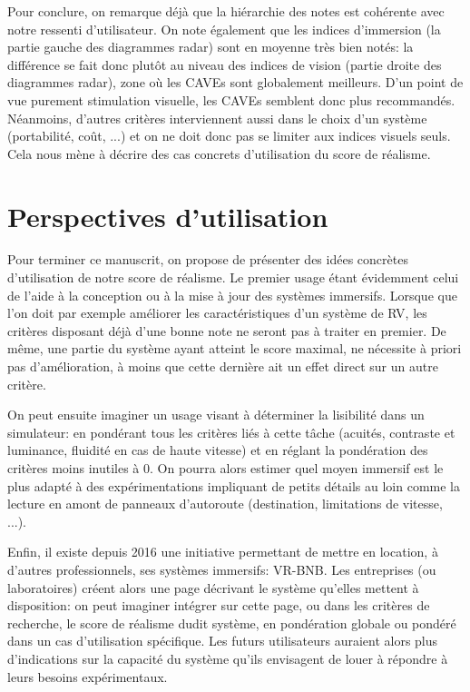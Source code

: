 \par Pour conclure, on remarque déjà que la hiérarchie des notes est cohérente avec notre ressenti d'utilisateur. On note également que les indices d'immersion (la partie gauche des diagrammes radar) sont en moyenne très bien notés: la différence se fait donc plutôt au niveau des indices de vision (partie droite des diagrammes radar), zone où les CAVEs sont globalement meilleurs. D'un point de vue purement stimulation visuelle, les CAVEs semblent donc plus recommandés. Néanmoins, d'autres critères interviennent aussi dans le choix d'un système (portabilité, coût, ...) et on ne doit donc pas se limiter aux indices visuels seuls. Cela nous mène à décrire des cas concrets d'utilisation du score de réalisme.

\section*{Perspectives d'utilisation}
\par Pour terminer ce manuscrit, on propose de présenter des idées concrètes d'utilisation de notre score de réalisme. Le premier usage étant évidemment celui de l'aide à la conception ou à la mise à jour des systèmes immersifs. Lorsque que l'on doit par exemple améliorer les caractéristiques d'un système de RV, les critères disposant déjà d'une bonne note ne seront pas à traiter en premier. De même, une partie du système ayant atteint le score maximal, ne nécessite à priori pas d'amélioration, à moins que cette dernière ait un effet direct sur un autre critère.

\par On peut ensuite imaginer un usage visant à déterminer la lisibilité dans un simulateur: en pondérant tous les critères liés à cette tâche (acuités, contraste et luminance, fluidité en cas de haute vitesse) et en réglant la pondération des critères moins inutiles à 0. On pourra alors estimer quel moyen immersif est le plus adapté à des expérimentations impliquant de petits détails au loin comme la lecture en amont de panneaux d'autoroute (destination, limitations de vitesse, ...).

\par Enfin, il existe depuis 2016 une initiative permettant de mettre en location, à d'autres professionnels, ses systèmes immersifs: VR-BNB. Les entreprises (ou laboratoires) créent alors une page décrivant le système qu'elles mettent à disposition: on peut imaginer intégrer sur cette page, ou dans les critères de recherche, le score de réalisme dudit système, en pondération globale ou pondéré dans un cas d'utilisation spécifique. Les futurs utilisateurs auraient alors plus d'indications sur la capacité du système qu'ils envisagent de louer à répondre à leurs besoins expérimentaux.